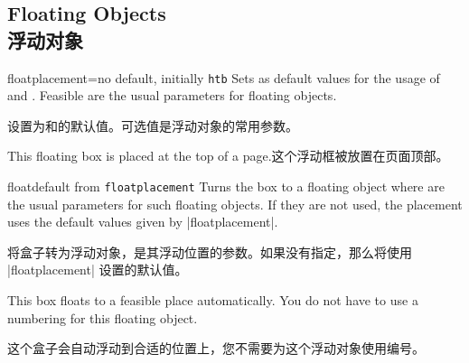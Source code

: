 \subsection{Floating Objects\\浮动对象}
\begin{docTcbKey}{floatplacement}{=}{no default, initially \texttt{htb}}
Sets  as default values for the usage of 
and .
Feasible are the usual parameters for floating objects.

设置为和的默认值。可选值是浮动对象的常用参数。
\begin{dispListing}

\begin{tcolorbox}[floatplacement=t,%
float,%
title=Floating box from |floatplacement|,%
watermark text={I am floating}]%
This floating box is placed at the top of a page.这个浮动框被放置在页面顶部。
\end{tcolorbox}
\end{dispListing}
\end{docTcbKey}
{\tcbusetemp}


\begin{docTcbKey}{float}{}{default from \texttt{floatplacement}}
Turns the box to a floating object where  are the
usual parameters for such floating objects.
If they are not used, the placement uses the default values given by
|floatplacement|.

将盒子转为浮动对象，是其浮动位置的参数。如果没有指定，那么将使用 |floatplacement| 设置的默认值。
\begin{dispListing}
\begin{tcolorbox}[float, title=Floating box from |float|,
enhanced,watermark text={I'm also floating}]
This box floats to a feasible place automatically. You do not have to
use a numbering for this floating object.

这个盒子会自动浮动到合适的位置上，您不需要为这个浮动对象使用编号。
\end{tcolorbox}
\end{dispListing}
\end{docTcbKey}
{\tcbusetemp}


